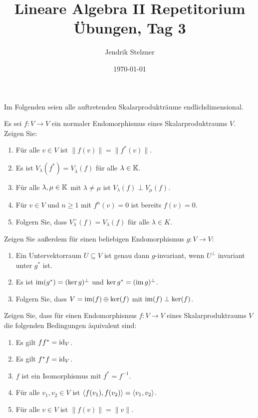 \documentclass[a4paper, 10pt]{scrartcl}
\title{Lineare Algebra II Repetitorium \\ Übungen, Tag 3}
\author{Jendrik Stelzner}
\date{\today}
\begin{document}
\maketitle


Im Folgenden seien alle auftretenden Skalarprodukträume endlichdimensional.


\begin{question}
  Es sei $f \colon V \to V$ ein normaler Endomorphismus eines Skalarproduktraums $V$.
  Zeigen Sie:
  \begin{enumerate}[leftmargin=*]
    \item
      Für alle $v \in V$ ist $\|f(v)\| = \|f^*(v)\|$.
    \item
      Es ist $V_\lambda(f^*) = V_{\overline{\lambda}}(f)$ für alle $\lambda \in \mathbb{K}$.
    \item
      Für alle $\lambda, \mu \in \mathbb{K}$ mit $\lambda \neq \mu$ ist $V_\lambda(f) \perp V_\mu(f)$.
    \item
      Für $v \in V$ und $n \geq 1$ mit $f^n(v) = 0$ ist bereits $f(v) = 0$.
    \item
      Folgern Sie, dass $V^\sim_\lambda(f) = V_\lambda(f)$ für alle $\lambda \in K$.
  \end{enumerate}
  Zeigen Sie außerdem für einen beliebigen Endomorphismus $g \colon V \to V$:
  \begin{enumerate}[leftmargin=*, resume]
    \item
      Ein Untervektorraum $U \subseteq V$ ist genau dann $g$-invariant, wenn $U^\perp$ invariant unter $g^*$ ist.
    \item
      Es ist $\operatorname{im}(g^*) = (\ker g)^\perp$ und $\ker g^* = (\operatorname{im} g)^\perp$.
    \item
      Folgern Sie, dass $V = \operatorname{im}(f) \oplus \ker(f)$ mit $\operatorname{im}(f) \perp \ker(f)$.
  \end{enumerate}
\end{question}


\begin{question}
  Zeigen Sie, dass für einen Endomorphismus $f \colon V \to V$ eines Skalarproduktraums $V$ die folgenden Bedingungen äquivalent sind:
  \begin{enumerate}[leftmargin=*]
    \item
      Es gilt $f f^* = \operatorname{id}_V$.
    \item
      Es gilt $f^* f = \operatorname{id}_V$.
    \item
      $f$ ist ein Isomorphismus mit $f^* = f^{-1}$.
    \item
      Für alle $v_1, v_2 \in V$ ist $\left\langle f(v_1), f(v_2) \right\rangle = \left\langle v_1, v_2 \right\rangle$.
    \item
      Für alle $v \in V$ ist $\|f(v)\| = \|v\|$.
  \end{enumerate}
\end{question}
\end{document}
